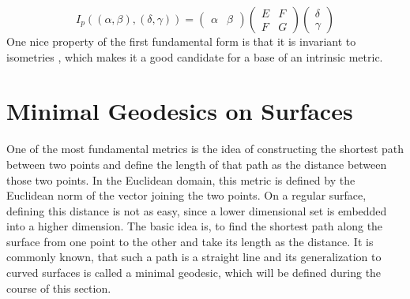 $$I_p((\alpha, \beta),(\delta, \gamma)) = \begin{pmatrix} \alpha & \beta \end{pmatrix} \begin{pmatrix} E & F \\ F & G \end{pmatrix} \begin{pmatrix}\delta \\ \gamma\end{pmatrix}$$
One nice property of the first fundamental form is that it is invariant to isometries \cite{do1976differential}, which makes it a good candidate for a base of an intrinsic metric.

\section{Minimal Geodesics on Surfaces}
One of the most fundamental metrics is the idea of constructing the shortest path between two points and define the length of that path as the distance between those two points.
In the Euclidean domain, this metric is defined by the Euclidean norm of the vector joining the two points.
On a regular surface, defining this distance is not as easy, since a lower dimensional set is embedded into a higher dimension.
The basic idea is, to find the shortest path along the surface from one point to the other and take its length as the distance.
It is commonly known, that such a path is a straight line and its generalization to curved surfaces is called a minimal geodesic, which will be defined during the course of this section.

